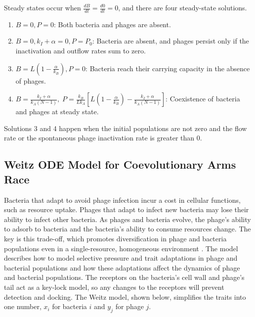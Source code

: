 Steady states occur when $\frac{dB}{dt} = \frac{d0}{dt} = 0$, and there are four steady-state solutions. 
\begin{enumerate}
    \item $B=0, P=0$: Both bacteria and phages are absent.
    \item $B=0, k_I + \alpha = 0, P = P_0$: Bacteria are absent, and phages persist only if the inactivation and outflow rates sum to zero.
    \item $B = L\left (1-\frac{\alpha}{k_B} \right ), P=0$: Bacteria reach their carrying capacity in the absence of phages.
    \item $B=\frac{k_I + \alpha}{k_A (N-1)},\; P=\frac{k_B}{Lk_A}\left [L\left ( 1- \frac{\alpha}{k_B} \right ) - \frac{k_I + \alpha}{k_A(N-1)}  \right ]$: Coexistence of bacteria and phages at steady state.
\end{enumerate}
Solutions 3 and 4 happen when the initial populations are not zero and the flow rate or the spontaneous phage inactivation rate is greater than 0. 

\subsection{Weitz ODE Model for Coevolutionary Arms Race}
Bacteria that adapt to avoid phage infection incur a cost in cellular functions, such as resource uptake. 
Phages that adapt to infect new bacteria may lose their ability to infect other bacteria.
As phages and bacteria evolve, the phage’s ability to adsorb to bacteria and the bacteria’s ability to consume resources change. 
The key is this trade-off, which promotes diversification in phage and bacteria populations even in a single-resource, homogeneous environment \cite{weitzCoevolutionaryArmsRaces2005}. 
The \citet{weitzCoevolutionaryArmsRaces2005} model describes how to model selective pressure and trait adaptations in phage and bacterial populations and how these adaptations affect the dynamics of phage and bacterial populations. 
The receptors on the bacteria’s cell wall and phage’s tail act as a key-lock model, so any changes to the receptors will prevent detection and docking. 
The Weitz model, shown below, simplifies the traits into one number, $x_i$ for bacteria $i$ and $y_j$ for phage $j$. 

